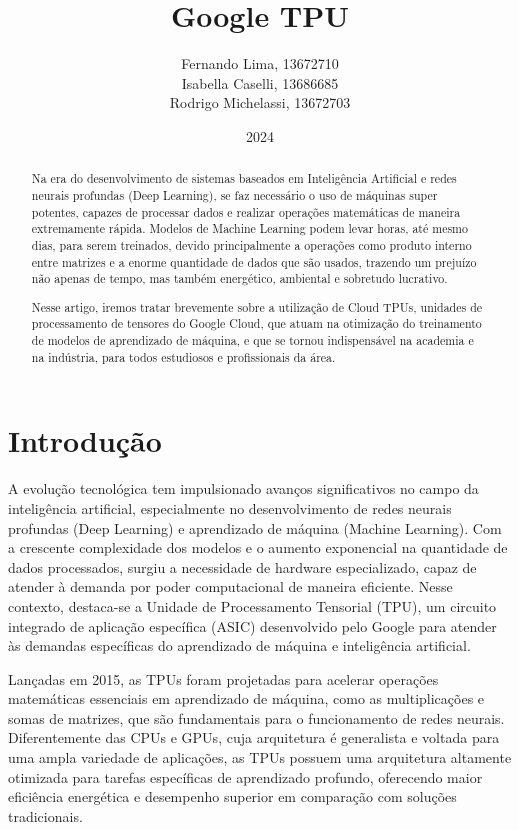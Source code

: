 \documentclass{report}
\title{Google TPU}
\author{Fernando Lima, 13672710 \\ Isabella Caselli, 13686685 \\ Rodrigo Michelassi, 13672703}
\date{2024}
\begin{document}
\maketitle
\tableofcontents	%

\begin{abstract}

\setlength{\parskip}{1em}\hspace{0.5cm} Na era do desenvolvimento de sistemas baseados em Inteligência Artificial e redes neurais profundas (Deep Learning), se faz necessário o uso de máquinas super potentes, capazes de processar dados e realizar operações matemáticas de maneira extremamente rápida. Modelos de Machine Learning podem levar horas, até mesmo dias, para serem treinados, devido principalmente a operações como produto interno entre matrizes e a enorme quantidade de dados que são usados, trazendo um prejuízo não apenas de tempo, mas também energético, ambiental e sobretudo lucrativo. 

\hspace{0.5cm} Nesse artigo, iremos tratar brevemente sobre a utilização de Cloud TPUs, unidades de processamento de tensores do Google Cloud, que atuam na otimização do treinamento de modelos de aprendizado de máquina, e que se tornou indispensável na academia e na indústria, para todos estudiosos e profissionais da área.
\end{abstract}

\chapter{Introdução}

\setlength{\parskip}{1em}\hspace{0.5cm} A evolução tecnológica tem impulsionado avanços significativos no campo da inteligência artificial, especialmente no desenvolvimento de redes neurais profundas (Deep Learning) e aprendizado de máquina (Machine Learning). Com a crescente complexidade dos modelos e o aumento exponencial na quantidade de dados processados, surgiu a necessidade de hardware especializado, capaz de atender à demanda por poder computacional de maneira eficiente. Nesse contexto, destaca-se a Unidade de Processamento Tensorial (TPU), um circuito integrado de aplicação específica (ASIC) desenvolvido pelo Google para atender às demandas específicas do aprendizado de máquina e inteligência artificial.

Lançadas em 2015, as TPUs foram projetadas para acelerar operações matemáticas essenciais em aprendizado de máquina, como as multiplicações e somas de matrizes, que são fundamentais para o funcionamento de redes neurais. Diferentemente das CPUs e GPUs, cuja arquitetura é generalista e voltada para uma ampla variedade de aplicações, as TPUs possuem uma arquitetura altamente otimizada para tarefas específicas de aprendizado profundo, oferecendo maior eficiência energética e desempenho superior em comparação com soluções tradicionais.
\end{document}
